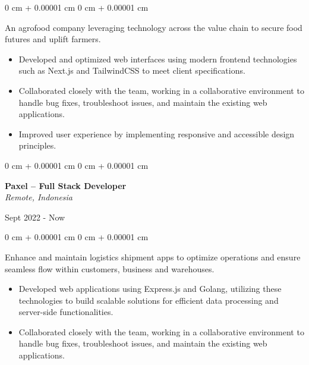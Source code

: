 \documentclass[10pt, letterpaper]{article}
\newenvironment{highlights}{
    \begin{itemize}[
        topsep=0.10 cm,
        parsep=0.10 cm,
        partopsep=0pt,
        itemsep=0pt,
        leftmargin=0 cm + 10pt
    ]
}{
    \end{itemize}
} %
\newenvironment{onecolentry}{
    \begin{adjustwidth}{
        0 cm + 0.00001 cm
    }{
        0 cm + 0.00001 cm
    }
}{
    \end{adjustwidth}
} %
\newenvironment{twocolentry}[2][]{
    \onecolentry
    \def\secondColumn{#2}
    \setcolumnwidth{\fill, 4.5 cm}
    \begin{paracol}{2}
}{
    \switchcolumn \raggedleft \secondColumn
    \end{paracol}
    \endonecolentry
} %
\begin{document}
        \vspace{0.10 cm}
        \begin{onecolentry}
            An agrofood company leveraging technology across the value chain to secure food futures and uplift farmers.
            \begin{highlights}
                \item Developed and optimized web interfaces using modern frontend technologies such as Next.js and TailwindCSS to meet client specifications.
                \item Collaborated closely with the team, working in a collaborative environment to handle bug fixes, troubleshoot issues, and maintain the existing web applications.
                \item Improved user experience by implementing responsive and accessible design principles.
            \end{highlights}
        \end{onecolentry}

        \vspace{0.2 cm}
        
        \begin{twocolentry}{
            Sept 2022 - Now
        }
             \textbf{Paxel -- Full Stack Developer} \\
             \textit{Remote, Indonesia}
            \end{twocolentry}

        \vspace{0.10 cm}
        \begin{onecolentry}
        Enhance and maintain logistics shipment apps to optimize operations and ensure seamless flow within customers, business and warehouses.
            \begin{highlights}
                \item Developed web applications using Express.js and Golang, utilizing these technologies to build scalable solutions for efficient data processing and server-side functionalities.
                \item Collaborated closely with the team, working in a collaborative environment to handle bug fixes, troubleshoot issues, and maintain the existing web applications.
            \end{highlights}
        \end{onecolentry}
        
        \vspace{0.2 cm}
        
\end{document}
